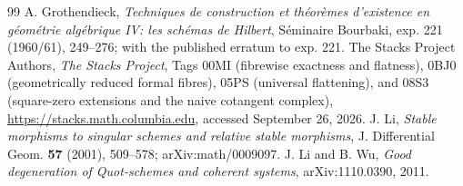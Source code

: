 \documentclass[11pt,reqno]{amsart}
\numberwithin{equation}{section}
\theoremstyle{definition}\newtheorem{definition}[theorem]{Definition}
\theoremstyle{remark}\newtheorem{remark}[theorem]{Remark}
\begin{document}
\begin{thebibliography}{99}
A. Grothendieck, \emph{Techniques de construction et th\'eor\`emes
d'existence en g\'eom\'etrie alg\'ebrique IV: les sch\'emas de Hilbert},
S\'eminaire Bourbaki, exp. 221 (1960/61), 249--276; with the published
erratum to exp. 221.
The Stacks Project Authors, \emph{The Stacks Project},
Tags 00MI (fibrewise exactness and flatness), 0BJ0 (geometrically
reduced formal fibres), 05PS (universal flattening), and 08S3
(square-zero extensions and the naive cotangent complex),
\url{https://stacks.math.columbia.edu}, accessed September 26, 2026.
J. Li, \emph{Stable morphisms to singular schemes and relative
stable morphisms}, J. Differential Geom. \textbf{57} (2001),
509--578; arXiv:math/0009097.
J. Li and B. Wu, \emph{Good degeneration of Quot-schemes and
coherent systems}, arXiv:1110.0390, 2011.

\end{thebibliography}
\end{document}
